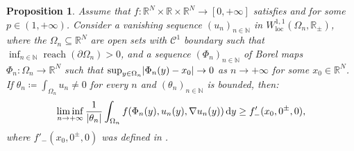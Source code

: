 \documentclass[JEP,XML,SOM,Unicode,published]{cedram}
\theoremstyle{plain}
\newtheorem{proposition}[theorem]{Proposition}
\theoremstyle{definition}
\newcommand{\dd}{\mathop{}\mathopen{}\mathrm{d}}
\newcommand{\N}{\mathbb{N}}
\newcommand{\R}{\mathbb{R}}
\newcommand{\Cspace}{\mathscr{C}}
\newcommand{\loc}{\mathrm{loc}}
\DeclarePairedDelimiter{\abs}{\lvert}{\rvert}
\DeclareMathOperator{\reach}{reach}
\begin{document}
\begin{proposition}\label{vanishingCost}
Assume that \(f:\R^N\times\R\times\R^N\to[0,+\infty]\) satisfies  and  for some \(p\in(1,+\infty)\). Consider a vanishing sequence $(u_n)_{n\in \N}$ in \(W^{1,1}_\loc(\Omega_n,\R_\pm)\), where the $\Omega_n\subseteq\R^N$ are open sets with \(\Cspace^1\) boundary such that \(\inf_{n\in\N}\reach(\partial\Omega_n)>0\), and a sequence $(\Phi_n)_{n\in\N}$ of Borel maps \(\Phi_n:\Omega_n\to\R^N\) such that $ \sup_{y\in\Omega_n}\abs{\Phi_n(y)-x_0} \to 0$ as \(n\to+\infty\) for some \(x_0\in\R^N\). If $\theta_n \coloneqq \int_{\Omega_n} u_n \neq 0$ for every $n$ and $(\theta_n)_{n\in\N}$ is bounded, then:
\[\liminf_{n\to+\infty} \frac 1{\abs{\theta_n}} \int_{\Omega_n} f(\Phi_n(y), u_n(y),\nabla u_n(y)) \dd y \geq f'_-(x_0,0^\pm,0),\]
where \(f'_-(x_0,0^\pm,0)\) was defined in .
\end{proposition}
\end{document}
